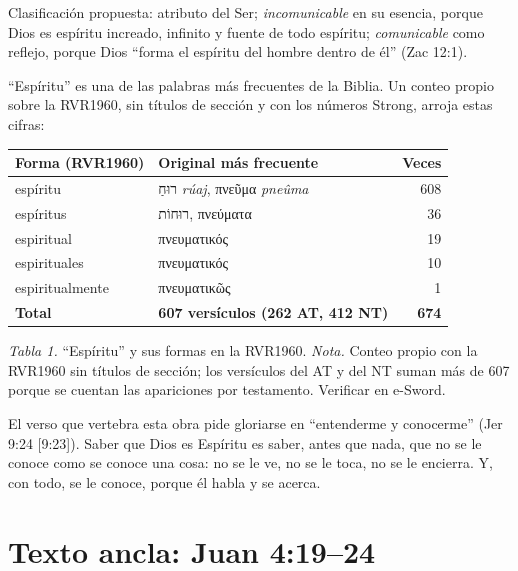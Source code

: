 \documentclass[11pt,letterpaper]{article}
\newcommand{\heb}[1]{\mbox{\foreignlanguage{hebrew}{#1}}}
\newcommand{\grc}[1]{\foreignlanguage{ancientgreek}{#1}}
\begin{document}
\begin{nota}[Precisión]
Clasificación propuesta: atributo del Ser; \emph{incomunicable} en su esencia, porque Dios es espíritu increado, infinito y fuente de todo espíritu; \emph{comunicable} como reflejo, porque Dios ``forma el espíritu del hombre dentro de él'' (Zac 12:1).
\end{nota}

``Espíritu'' es una de las palabras más frecuentes de la Biblia. Un conteo propio sobre la RVR1960, sin títulos de sección y con los números Strong, arroja estas cifras:

\begin{center}\small\renewcommand{\arraystretch}{1.18}
\begin{tabular}{@{}L{4.2cm}L{5.4cm}r@{}}
\toprule
\textbf{Forma (RVR1960)} & \textbf{Original más frecuente} & \textbf{Veces} \\ \midrule
espíritu & \heb{רוּחַ} \emph{rúaj}, \grc{πνεῦμα} \emph{pneûma} & 608 \\
espíritus & \heb{רוּחוֹת}, \grc{πνεύματα} & 36 \\
espiritual & \grc{πνευματικός} & 19 \\
espirituales & \grc{πνευματικός} & 10 \\
espiritualmente & \grc{πνευματικῶς} & 1 \\ \midrule
\textbf{Total} & \textbf{607 versículos (262 AT, 412 NT)} & \textbf{674} \\
\bottomrule
\end{tabular}\par
{\footnotesize\color{gris}\textit{Tabla 1.} ``Espíritu'' y sus formas en la RVR1960. \textit{Nota.} Conteo propio con la RVR1960 sin títulos de sección; los versículos del AT y del NT suman más de 607 porque se cuentan las apariciones por testamento. Verificar en e-Sword.}
\end{center}

El verso que vertebra esta obra pide gloriarse en ``entenderme y conocerme'' (Jer 9:24 [9:23]). Saber que Dios es Espíritu es saber, antes que nada, que no se le conoce como se conoce una cosa: no se le ve, no se le toca, no se le encierra. Y, con todo, se le conoce, porque él habla y se acerca.

\section{Texto ancla: Juan 4:19--24}
\end{document}
